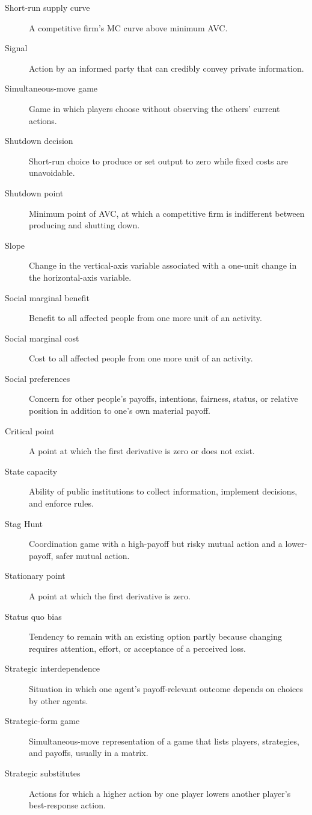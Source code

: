 \begin{description}
  \item[Short-run supply curve] A competitive firm's MC curve above minimum AVC.
  \item[Signal] Action by an informed party that can credibly convey private information.
  \item[Simultaneous-move game] Game in which players choose without observing the others' current actions.
  \item[Shutdown decision] Short-run choice to produce or set output to zero while fixed costs are unavoidable.
  \item[Shutdown point] Minimum point of AVC, at which a competitive firm is indifferent between producing and shutting down.
  \item[Slope] Change in the vertical-axis variable associated with a one-unit change in the horizontal-axis variable.
  \item[Social marginal benefit] Benefit to all affected people from one more unit of an activity.
  \item[Social marginal cost] Cost to all affected people from one more unit of an activity.
  \item[Social preferences] Concern for other people's payoffs, intentions, fairness, status, or relative position in addition to one's own material payoff.
  \item[Critical point] A point at which the first derivative is zero or does not exist.
  \item[State capacity] Ability of public institutions to collect information, implement decisions, and enforce rules.
  \item[Stag Hunt] Coordination game with a high-payoff but risky mutual action and a lower-payoff, safer mutual action.
  \item[Stationary point] A point at which the first derivative is zero.
  \item[Status quo bias] Tendency to remain with an existing option partly because changing requires attention, effort, or acceptance of a perceived loss.
  \item[Strategic interdependence] Situation in which one agent's payoff-relevant outcome depends on choices by other agents.
  \item[Strategic-form game] Simultaneous-move representation of a game that lists players, strategies, and payoffs, usually in a matrix.
  \item[Strategic substitutes] Actions for which a higher action by one player lowers another player's best-response action.

\end{description}
